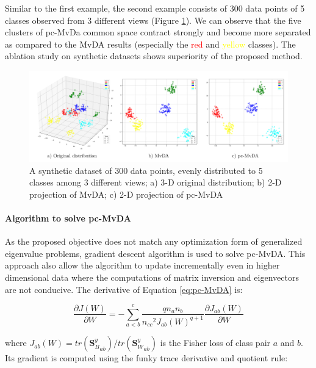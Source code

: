        Similar to the first example, the second example consists of 300 data points of 5 classes observed from 3 different views (Figure \ref{fig:synthetic2}).
        We can observe that the five clusters of pc-MvDa common space contract strongly and become more separated as compared to the MvDA results (especially the \textcolor{red}{red} and \textcolor{yellow}{yellow} classes).
        The ablation study on synthetic datasets shows superiority of the proposed method.

        \begin{figure}[htbp]
            \centering
            \includegraphics[width=1\linewidth]{Figs/Synthetic2.png}
            \caption{A synthetic dataset of 300 data points, evenly distributed to 5 classes among 3 different views; a) 3-D original distribution; b) 2-D projection of MvDA; c) 2-D projection of pc-MvDA}
            \label{fig:synthetic2}
        \end{figure}

    \paragraph{Algorithm to solve pc-MvDA}
        As the proposed objective does not match any optimization form of generalized eigenvalue problems, gradient descent algorithm is used to solve pc-MvDA. This approach also allow the algorithm to update incrementally even in higher dimensional data where the computations of matrix inversion and eigenvectors are not conducive. The derivative of Equation \eqref{eq:pc-MvDA} is:

        \begin{equation}
            \frac{\partial J\left(W\right)}{\partial W}=-\sum_{a<b}^{c}{\frac{qn_an_b}{{n_{cc}}^2{J_{ab}\left(W\right)}^{q+1}}\frac{\partial J_{ab}\left(W\right)}{\partial W}}
        \end{equation}

        where $J_{ab}\left(W\right)={tr\left({\boldsymbol{S}_B^y}_{ab}\right)}/{tr\left({\boldsymbol{S}_W^y}_{ab}\right)}$ is the Fisher loss of class pair $a$ and $b$. Its gradient is computed using the funky trace derivative and quotient rule:

